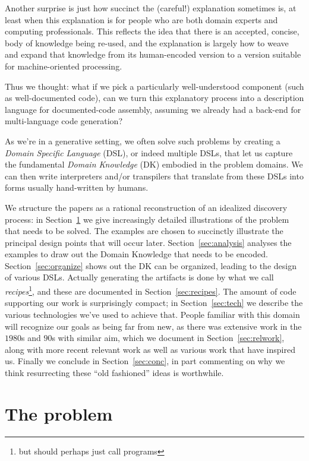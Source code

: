 \documentclass[english,submission]{programming}
\begin{document}
Another surprise is just how succinct the (careful!) explanation sometimes is, at
least when this explanation is for people who are both domain experts and computing
professionals. This reflects the idea that there is an accepted, concise, body of
knowledge being re-used, and the explanation is largely how to weave and expand that
knowledge from its human-encoded version to a version suitable for machine-oriented
processing.

Thus we thought: what if we pick a particularly well-understood component (such as
well-documented code), can we turn this explanatory process into a description
language for documented-code assembly, assuming we already had a back-end for
multi-language code generation?

As we're in a generative setting, we often solve such problems by creating a
\emph{Domain Specific Language} (DSL), or indeed multiple DSLs, that let us
capture the fundamental \emph{Domain Knowledge} (DK) embodied in the problem domains.
We can then write interpreters and/or transpilers that translate from these DSLs
into forms usually hand-written by humans.

We structure the papers as a rational reconstruction of an idealized discovery
process: in Section~\ref{sec:problem} we give increasingly detailed illustrations
of the problem that needs to be solved. The examples are chosen to succinctly
illustrate the principal design points that will occur later. Section~\ref{sec:analysis}
analyses the examples to draw out the Domain Knowledge that needs to be encoded.
Section~\ref{sec:organize} shows out the DK can be organized, leading to the design
of various DSLs. Actually generating the artifacts is done by what we call
\emph{recipes}\footnote{but should perhaps just call programs}, and these are documented
in Section~\ref{sec:recipes}. The amount of code supporting our work is surprisingly
compact; in Section~\ref{sec:tech} we describe the various technologies we've used
to achieve that. People familiar with this domain will recognize our goals as being
far from new, as there was extensive work in the $1980$s and $90$s with similar aim,
which we document in Section~\ref{sec:relwork}, along with more recent relevant work
as well as various work that have inspired us. Finally we conclude in Section~\ref{sec:conc},
in part commenting on why we think resurrecting these ``old fashioned'' ideas is
worthwhile.

\section{The problem}
\label{sec:problem}
\end{document}
